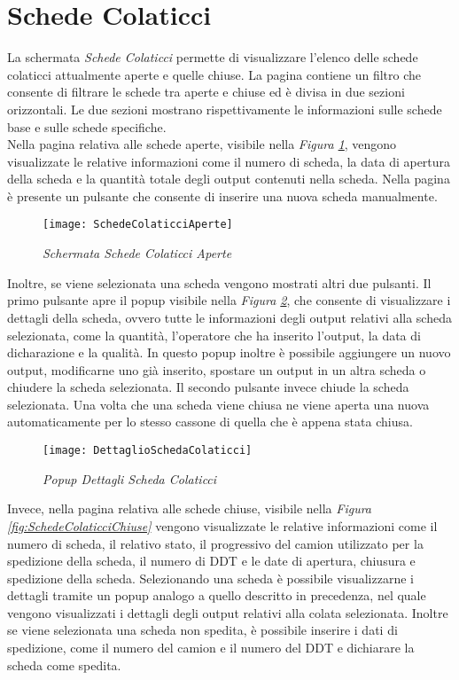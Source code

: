   \section{Schede Colaticci}
  La schermata \textit{Schede Colaticci} permette di visualizzare l'elenco delle schede colaticci
  attualmente aperte e quelle chiuse. La pagina contiene un filtro che consente di filtrare le schede tra aperte e chiuse ed
  è divisa in due sezioni orizzontali. Le due sezioni mostrano rispettivamente le informazioni sulle schede base e sulle schede
  specifiche.\\
  Nella pagina relativa alle schede aperte, visibile nella \textit{Figura \ref{fig:SchedeColaticciAperte}}, vengono
  visualizzate le relative informazioni come il numero di scheda, la data di apertura della scheda e la quantità totale
  degli output contenuti nella scheda. Nella pagina è presente un pulsante che consente di inserire una nuova scheda manualmente. 

  \begin{figure}[H]
    \texttt{[image: SchedeColaticciAperte]}
    \centering
    \caption{\textit{Schermata Schede Colaticci Aperte}}
    \label{fig:SchedeColaticciAperte}
  \end{figure}
    
  Inoltre, se viene selezionata una scheda vengono mostrati altri due pulsanti. Il primo pulsante apre
  il popup visibile nella \textit{Figura \ref{fig:DettaglioSchedaColaticci}}, che consente di visualizzare i dettagli 
  della scheda, ovvero tutte le informazioni degli output relativi alla scheda selezionata, come la quantità, 
  l'operatore che ha inserito l'output, la data di dicharazione e la qualità. In questo popup inoltre è possibile
  aggiungere un nuovo output, modificarne uno già inserito, spostare un output in un altra scheda o chiudere la
  scheda selezionata. Il secondo pulsante invece chiude la scheda selezionata. Una volta che una scheda viene chiusa ne viene
  aperta una nuova automaticamente per lo stesso cassone di quella che è appena stata chiusa.\\
  
  \begin{figure}[H]
    \texttt{[image: DettaglioSchedaColaticci]}
    \centering
    \caption{\textit{Popup Dettagli Scheda Colaticci}}
    \label{fig:DettaglioSchedaColaticci}
  \end{figure}
  
  Invece, nella pagina relativa alle schede chiuse, visibile nella \textit{Figura \ref{fig:SchedeColaticciChiuse}}
  vengono visualizzate le relative informazioni come il numero di scheda,
  il relativo stato, il progressivo del camion utilizzato per la spedizione della scheda, il numero di DDT e le date di apertura,
  chiusura e spedizione della scheda. Selezionando una scheda è possibile visualizzarne i dettagli tramite un popup analogo a
  quello descritto in precedenza, nel quale vengono visualizzati i dettagli degli output relativi alla colata selezionata.
  Inoltre se viene selezionata una scheda non spedita, è possibile inserire i dati di spedizione, come il numero del camion
  e il numero del DDT e dichiarare la scheda come spedita.

